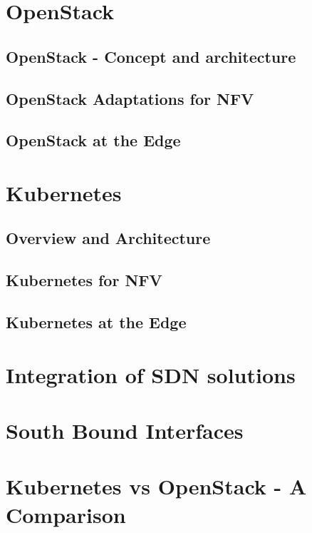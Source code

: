 \documentclass[../seminar.tex]{subfiles}
\begin{document}
	
\section{OpenStack}

\subsection{OpenStack - Concept and architecture}

\subsection{OpenStack Adaptations for NFV}

\subsection{OpenStack at the Edge}

\section{Kubernetes}

\subsection{Overview and Architecture}

\subsection{Kubernetes for NFV}

\subsection{Kubernetes at the Edge}

\section{Integration of SDN solutions}

\section{South Bound Interfaces}

\section{Kubernetes vs OpenStack - A Comparison}
\end{document}
